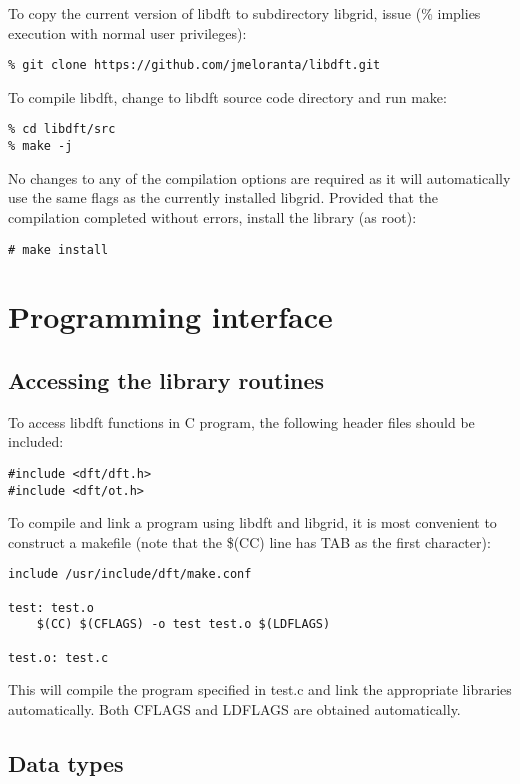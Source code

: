\documentclass[12pt,letterpaper]{report}
\begin{document}
To copy the current version of libdft to subdirectory libgrid, issue 
(\% implies execution with normal user privileges):
\begin{verbatim}
% git clone https://github.com/jmeloranta/libdft.git
\end{verbatim}
To compile libdft, change to libdft source code directory and run make:
\begin{verbatim}
% cd libdft/src
% make -j
\end{verbatim}
No changes to any of the compilation options are required as it will 
automatically use the same flags as the currently installed libgrid.
Provided that the compilation completed without errors, install the library 
(as root):
\begin{verbatim}
# make install
\end{verbatim}

\chapter{Programming interface}

\section{Accessing the library routines}

To access libdft functions in C program, the following header files should be 
included:
\begin{verbatim}
#include <dft/dft.h>
#include <dft/ot.h>
\end{verbatim}

To compile and link a program using libdft and libgrid, it is most convenient 
to construct a makefile (note that the \$(CC) line has TAB as the first 
character):
\begin{verbatim}
include /usr/include/dft/make.conf

test: test.o
    $(CC) $(CFLAGS) -o test test.o $(LDFLAGS)

test.o: test.c
\end{verbatim}
This will compile the program specified in test.c and link the appropriate 
libraries automatically. Both CFLAGS and LDFLAGS are obtained automatically. 

\section{Data types}
\end{document}
